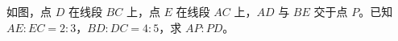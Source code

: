 \documentclass{exam-zh}
\begin{document}

\begin{eduProblemBlock}[例题]
\noindent
\begin{minipage}[t]{\dimexpr\linewidth-70mm-6mm\relax}
\vspace{0pt}
如图，点 $D$ 在线段 $BC$ 上，点 $E$ 在线段 $AC$ 上，$AD$ 与 $BE$ 交于点 $P$。已知 $AE:EC=2:3$，$BD:DC=4:5$，求 $AP:PD$。
\end{minipage}\hfill
\begin{diagramcoltikz}{70mm}{}
}
\end{diagramcoltikz}
\end{eduProblemBlock}
\end{document}
